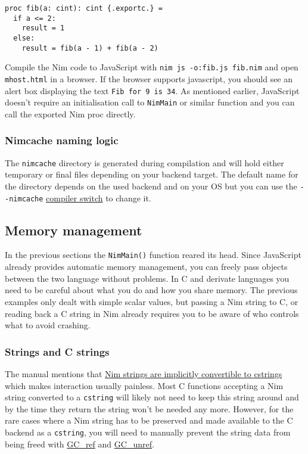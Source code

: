 \begin{verbatim}
proc fib(a: cint): cint {.exportc.} =
  if a <= 2:
    result = 1
  else:
    result = fib(a - 1) + fib(a - 2)
\end{verbatim}

Compile the Nim code to JavaScript with
\texttt{nim\ js\ -o:fib.js\ fib.nim} and open \texttt{mhost.html} in a
browser. If the browser supports javascript, you should see an alert box
displaying the text \texttt{Fib\ for\ 9\ is\ 34}. As mentioned earlier,
JavaScript doesn't require an initialisation call to \texttt{NimMain} or
similar function and you can call the exported Nim proc directly.

\hypertarget{nimcache-naming-logic}{%
\subsubsection{Nimcache naming logic}\label{nimcache-naming-logic}}

The \texttt{nimcache} directory is generated during compilation and will
hold either temporary or final files depending on your backend target.
The default name for the directory depends on the used backend and on
your OS but you can use the \texttt{-\/-nimcache}
\href{nimc.html\#compiler-usage-command-line-switches}{compiler switch}
to change it.

\hypertarget{memory-management}{%
\subsection{Memory management}\label{memory-management}}

In the previous sections the \texttt{NimMain()} function reared its
head. Since JavaScript already provides automatic memory management, you
can freely pass objects between the two language without problems. In C
and derivate languages you need to be careful about what you do and how
you share memory. The previous examples only dealt with simple scalar
values, but passing a Nim string to C, or reading back a C string in Nim
already requires you to be aware of who controls what to avoid crashing.

\hypertarget{strings-and-c-strings}{%
\subsubsection{Strings and C strings}\label{strings-and-c-strings}}

The manual mentions that \href{manual.html\#types-cstring-type}{Nim
strings are implicitly convertible to cstrings} which makes interaction
usually painless. Most C functions accepting a Nim string converted to a
\texttt{cstring} will likely not need to keep this string around and by
the time they return the string won't be needed any more. However, for
the rare cases where a Nim string has to be preserved and made available
to the C backend as a \texttt{cstring}, you will need to manually
prevent the string data from being freed with
\href{system.html\#GC_ref,string}{GC\_ref} and
\href{system.html\#GC_unref,string}{GC\_unref}.

